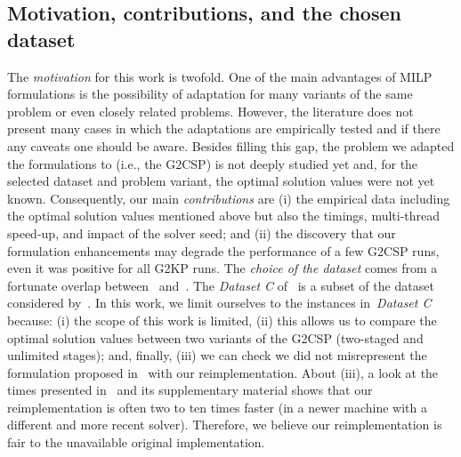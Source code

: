 \documentclass[9pt]{entcs}
\begin{document}
\subsection{Motivation, contributions, and the chosen dataset}

The \emph{motivation} for this work is twofold.
One of the main advantages of MILP formulations is the possibility of adaptation for many variants of the same problem or even closely related problems.
However, the literature does not present many cases in which the adaptations are empirically tested and if there any caveats one should be aware.
Besides filling this gap, the problem we adapted the formulations to (i.e., the G2CSP) is not deeply studied yet and, for the selected dataset and problem variant, the optimal solution values were not yet known.
Consequently, our main \emph{contributions} are (i) the empirical data including the optimal solution values mentioned above but also the timings, multi-thread speed-up, and impact of the solver seed; and (ii) the discovery that our formulation enhancements may degrade the performance of a few G2CSP runs, even it was positive for all G2KP runs.
The \emph{choice of the dataset} comes from a fortunate overlap between~\cite{furini:2016} and~\cite{silva:2010}.
The \emph{Dataset C} of~\cite{silva:2010} is a subset of the dataset considered by~\cite{furini:2016}.
In this work, we limit ourselves to the instances in~\emph{Dataset C} because: (i) the scope of this work is limited, (ii) this allows us to compare the optimal solution values between two variants of the G2CSP (two-staged and unlimited stages); and, finally, (iii) we can check we did not misrepresent the formulation proposed in~\cite{furini:2016} with our reimplementation.
About (iii), a look at the times presented in~\cite{furini:2016} and its supplementary material shows that our reimplementation is often two to ten times faster (in a newer machine with a different and more recent solver).
Therefore, we believe our reimplementation is fair to the unavailable original implementation.
\end{document}
